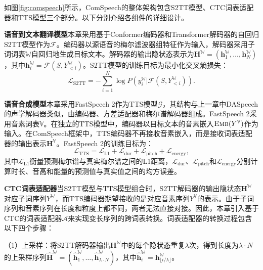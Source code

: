 如图\ref{fig:comspeech}所示，ComSpeech的整体架构包含S2TT模型、CTC词表适配器和TTS模型三个部分。以下分别介绍各组件的详细设计。



\textbf{语音到文本翻译模型}\quad 本章采用基于Conformer\citep{conformer}编码器和Transformer\citep{transformer}解码器的自回归S2TT模型作为$\mathcal{F}$。编码器以源语音的梅尔滤波器组特征作为输入，解码器采用子词词表$\mathbb{W}$自回归地生成目标文本。解码器的输出隐状态表示为$\mathbf{H}^{\mathbb{W}}=(\mathbf{h}^{\mathbb{W}}_1, \ldots, \mathbf{h}^{\mathbb{W}}_N)$，其中$\mathbf{h}^{\mathbb{W}}_i = \mathcal{F}(S, Y^{\mathbb{W}}_{<i})$。S2TT模型的训练目标为最小化交叉熵损失：
\begin{equation}
    \mathcal{L}_{\text{S2TT}} = -\sum_{i=1}^{N}\log P(y^{\mathbb{W}}_i | \mathcal{F}(S, Y^{\mathbb{W}}_{<i})).
\end{equation}

\textbf{语音合成模型}\quad 本章采用FastSpeech 2\citep{ren2021fastspeech2}作为TTS模型$\mathcal{G}$，其结构与上一章中DASpeech的声学解码器类似，由编码器、方差适配器和梅尔谱解码器组成。FastSpeech 2采用音素词表$\mathbb{V}$。在独立的TTS模型中，编码器以目标文本的音素嵌入$\text{\textsc{Emb}}(Y^{\mathbb{V}})$作为输入。在ComSpeech框架中，TTS编码器不再接收音素嵌入，而是接收词表适配器的输出表示$\mathbf{H}^{\mathbb{V}}$。FastSpeech 2的训练目标为：
\begin{equation}
    \mathcal{L}_{\text{TTS}} = \mathcal{L}_{\text{L1}} + \mathcal{L}_{\text{dur}} + \mathcal{L}_{\text{pitch}} + \mathcal{L}_{\text{energy}},
\end{equation}
其中$\mathcal{L}_{\text{L1}}$衡量预测梅尔谱与真实梅尔谱之间的L1距离，$\mathcal{L}_{\text{dur}}$、$\mathcal{L}_{\text{pitch}}$和$\mathcal{L}_{\text{energy}}$分别计算时长、音高和能量的预测值与真实值之间的均方误差。

\textbf{CTC词表适配器}\quad 当S2TT模型与TTS模型组合时，S2TT解码器的输出隐状态$\mathbf{H}^{\mathbb{W}}$对应子词序列$Y^{\mathbb{W}}$，而TTS编码器期望接收的是对应音素序列$Y^{\mathbb{V}}$的表示。由于子词序列和音素序列在长度和粒度上都不同，两者无法直接对接。因此，本章引入基于CTC的词表适配器$\mathcal{A}$来实现变长序列的跨词表转换。词表适配器的转换过程包含以下四个步骤：

（1）上采样：将S2TT解码器输出$\mathbf{H}^{\mathbb{W}}$中的每个隐状态重复$\lambda$次，得到长度为$\lambda\cdot N$的上采样序列$\widehat{\mathbf{H}}^{\mathbb{W}}=(\widehat{\mathbf{h}}^{\mathbb{W}}_1, \ldots, \widehat{\mathbf{h}}^{\mathbb{W}}_{\lambda\cdot N})$，其中$\widehat{\mathbf{h}}^{\mathbb{W}}_i = \mathbf{h}^{\mathbb{W}}_{\lfloor i/\lambda\rfloor}$。


